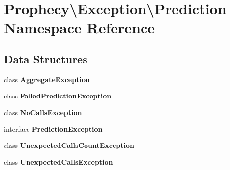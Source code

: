 \section{Prophecy\textbackslash{}Exception\textbackslash{}Prediction Namespace Reference}
\label{namespace_prophecy_1_1_exception_1_1_prediction}
\subsection*{Data Structures}
\begin{DoxyCompactItemize}
\item 
class {\bf Aggregate\+Exception}
\item 
class {\bf Failed\+Prediction\+Exception}
\item 
class {\bf No\+Calls\+Exception}
\item 
interface {\bf Prediction\+Exception}
\item 
class {\bf Unexpected\+Calls\+Count\+Exception}
\item 
class {\bf Unexpected\+Calls\+Exception}
\end{DoxyCompactItemize}
